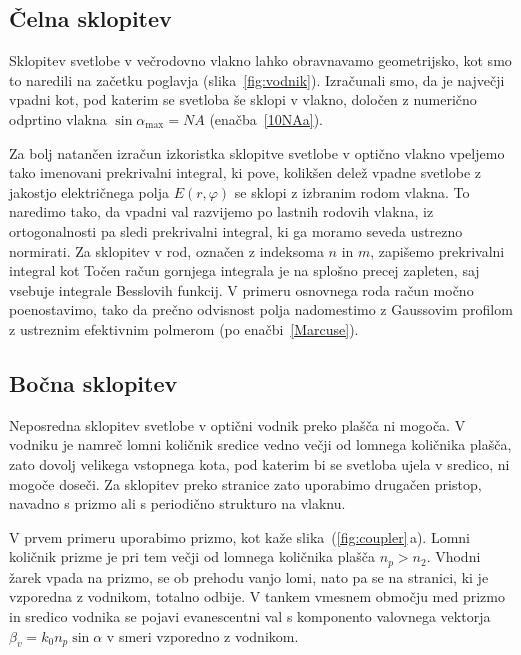 \subsection*{Čelna sklopitev}
Sklopitev svetlobe v večrodovno vlakno lahko obravnavamo geometrijsko, kot smo to naredili
na začetku poglavja (slika~\ref{fig:vodnik}). Izračunali smo, da je največji 
vpadni kot, pod katerim se svetloba še sklopi v vlakno, določen z numerično odprtino 
vlakna $\sin \alpha_{\mathrm{max}}= NA$  (enačba~\ref{10NAa}).

Za bolj natančen izračun izkoristka sklopitve svetlobe v optično vlakno vpeljemo 
tako imenovani prekrivalni integral, ki pove, kolikšen delež vpadne svetlobe 
z jakostjo električnega polja $E(r, \varphi)$ se sklopi z izbranim rodom 
vlakna.
To naredimo tako, da vpadni val razvijemo po lastnih rodovih vlakna, iz ortogonalnosti
pa sledi prekrivalni integral, ki ga moramo seveda ustrezno normirati. Za sklopitev v rod, 
označen z indeksoma $n$ in $m$, zapišemo prekrivalni integral kot
Točen račun gornjega integrala je na splošno precej zapleten, saj vsebuje integrale
Besslovih funkcij. V primeru osnovnega roda račun močno poenostavimo, tako da 
prečno odvisnost polja nadomestimo z Gaussovim profilom z ustreznim 
efektivnim polmerom (po enačbi~\ref{Marcuse}). 

\subsection*{Bočna sklopitev}
Neposredna sklopitev svetlobe v optični vodnik preko plašča ni mogoča. V vodniku je namreč
lomni količnik sredice vedno večji od lomnega količnika plašča, zato dovolj velikega vstopnega 
kota, pod katerim bi se svetloba ujela v sredico, ni mogoče doseči. Za sklopitev preko stranice 
zato uporabimo drugačen pristop, navadno s prizmo ali s periodično strukturo na vlaknu. 

V prvem primeru uporabimo prizmo, kot kaže slika~(\ref{fig:coupler}\,a). Lomni količnik prizme
je pri tem večji od lomnega količnika plašča $n_p > n_2$.
Vhodni žarek vpada na prizmo, se ob prehodu vanjo lomi, nato pa se na stranici, ki je vzporedna
z vodnikom, totalno odbije. 
V tankem vmesnem območju med prizmo in sredico vodnika se pojavi evanescentni
val s komponento valovnega vektorja $\beta_v  = k_0 n_p \sin \alpha$ v 
smeri vzporedno z vodnikom. 

